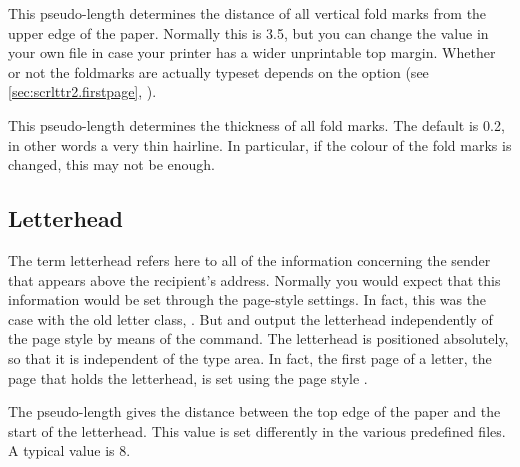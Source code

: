 \begin{Declaration}
\end{Declaration}
This pseudo-length determines the distance of
all vertical fold marks from the upper edge of the paper. Normally this is
3.5, but you can change the value in your own
 file in case your printer has a wider unprintable
top margin. Whether or not the foldmarks are actually typeset depends on the 
%
%
 option (see
\autoref{sec:scrlttr2.firstpage}, ).
%
\EndIndexGroup


\begin{Declaration}
\end{Declaration}
This pseudo-length determines the
thickness of all fold marks. The default is 0.2, in other words a
very thin hairline. In particular, if the colour of the fold
marks is changed, this may not be enough.%
\EndIndexGroup
%
\EndIndexGroup


\subsection{Letterhead}
\BeginIndexGroup
{}%

The term letterhead refers here to all of the information concerning the
sender that appears above the recipient's address. Normally you would expect
that this information would be set through the page-style settings. In fact,
this was the case with the old letter class, .
But  and  output the
letterhead independently of the page style by means of the
 command.
\iftrue%
  The letterhead is positioned absolutely, so that it is independent of the
  type area. In fact, the first page of a letter, the page that holds the
  letterhead, is set using the page style
  .%
\fi


\begin{Declaration}
\end{Declaration}
The  pseudo-length gives the distance between the top
edge of the paper and the start of the letterhead. This value is set
differently in the various predefined
 files. A
typical value is 8.%
\EndIndexGroup


